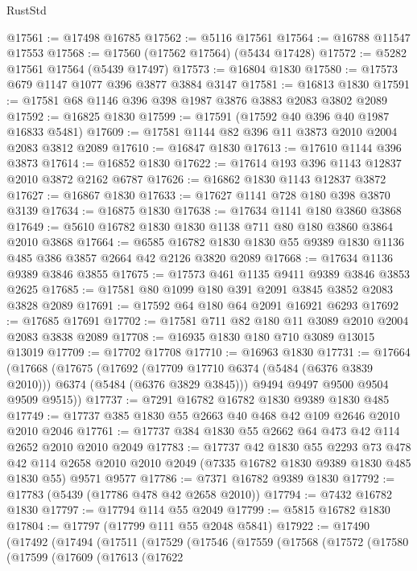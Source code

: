 \begin{lexlean}{RustStd}
\begin{coremodule}
@17561 := @17498 @16785
@17562 := @5116 @17561
@17564 := @16788 @11547 @17553
@17568 := @17560 (@17562 @17564) (@5434 @17428)
@17572 := @5282 @17561 @17564 (@5439 @17497)
@17573 := @16804 @1830
@17580 := @17573 @679 @1147 @1077 @396 @3877 @3884 @3147
@17581 := @16813 @1830
@17591 := @17581 @68 @1146 @396 @398 @1987 @3876 @3883 @2083 @3802 @2089
@17592 := @16825 @1830
@17599 := @17591 (@17592 @40 @396 @40 @1987 @16833 @5481)
@17609 := @17581 @1144 @82 @396 @11 @3873 @2010 @2004 @2083 @3812 @2089
@17610 := @16847 @1830
@17613 := @17610 @1144 @396 @3873
@17614 := @16852 @1830
@17622 := @17614 @193 @396 @1143 @12837 @2010 @3872 @2162 @6787
@17626 := @16862 @1830 @1143 @12837 @3872
@17627 := @16867 @1830
@17633 := @17627 @1141 @728 @180 @398 @3870 @3139
@17634 := @16875 @1830
@17638 := @17634 @1141 @180 @3860 @3868
@17649 := @5610 @16782 @1830 @1830 @1138 @711 @80 @180 @3860 @3864 @2010 @3868
@17664 := @6585 @16782 @1830 @1830 @55 @9389 @1830 @1136 @485 @386 @3857 @2664 @42 @2126 @3820 @2089
@17668 := @17634 @1136 @9389 @3846 @3855
@17675 := @17573 @461 @1135 @9411 @9389 @3846 @3853 @2625
@17685 := @17581 @80 @1099 @180 @391 @2091 @3845 @3852 @2083 @3828 @2089
@17691 := @17592 @64 @180 @64 @2091 @16921 @6293
@17692 := @17685 @17691
@17702 := @17581 @711 @82 @180 @11 @3089 @2010 @2004 @2083 @3838 @2089
@17708 := @16935 @1830 @180 @710 @3089 @13015 @13019
@17709 := @17702 @17708
@17710 := @16963 @1830
@17731 := @17664
    (@17668
      (@17675
        (@17692 (@17709 @17710 @6374 (@5484 (@6376 @3839 @2010))) @6374 (@5484 (@6376 @3829 @3845)))
        @9494
        @9497
        @9500
        @9504
        @9509
        @9515))
@17737 := @7291 @16782 @16782 @1830 @9389 @1830 @485
@17749 := @17737 @385 @1830 @55 @2663 @40 @468 @42 @109 @2646 @2010 @2010 @2046
@17761 := @17737 @384 @1830 @55 @2662 @64 @473 @42 @114 @2652 @2010 @2010 @2049
@17783 := @17737
    @42
    @1830
    @55
    @2293
    @73
    @478
    @42
    @114
    @2658
    @2010
    @2010
    @2049
    (@7335 @16782 @1830 @9389 @1830 @485 @1830 @55)
    @9571
    @9577
@17786 := @7371 @16782 @9389 @1830
@17792 := @17783 (@5439 (@17786 @478 @42 @2658 @2010))
@17794 := @7432 @16782 @1830
@17797 := @17794 @114 @55 @2049
@17799 := @5815 @16782 @1830
@17804 := @17797 (@17799 @111 @55 @2048 @5841)
@17922 := @17490
    (@17492
      (@17494
        (@17511
          (@17529
            (@17546
              (@17559
                (@17568
                  (@17572
                    (@17580
                      (@17599
                        (@17609
                          (@17613
                            (@17622

\end{coremodule}
\end{lexlean}
